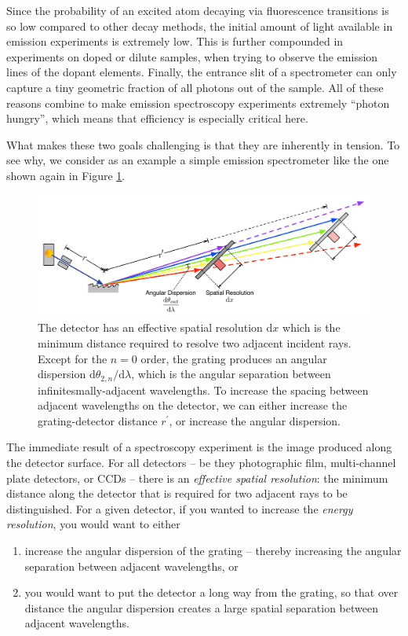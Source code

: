 Since the probability of an excited atom decaying via fluorescence transitions is so low compared to other decay methods, the initial amount of light available in emission experiments is extremely low.  This is further compounded in experiments on doped or dilute samples, when trying to observe the emission lines of the dopant elements.  Finally, the entrance slit of a spectrometer can only capture a tiny geometric fraction of all photons out of the sample.  All of these reasons combine to make emission spectroscopy experiments extremely ``photon hungry'', which means that efficiency is especially critical here.

What makes these two goals challenging is that they are inherently in tension.  To see why, we consider as an example a simple emission spectrometer like the one shown again in Figure \ref{1f}.

\begin{figure}[htbp] %
   \centering
   \includegraphics[scale=0.6]{../data/Chapter1/1f_spectrometerResolution/1f_2.pdf} 
   \caption{The detector has an effective spatial resolution $\mathrm{d}x$ which is the minimum distance required to resolve two adjacent incident rays.  Except for the $n=0$ order, the grating produces an angular dispersion $\mathrm{d}\theta_{2,n}/\mathrm{d}\lambda$, which is the angular separation between infinitesmally-adjacent wavelengths.  To increase the spacing between adjacent wavelengths on the detector, we can either increase the grating-detector distance $r^\prime$, or increase the angular dispersion. }
   \label{1f}
\end{figure}
               
The immediate result of a spectroscopy experiment is the image produced along the detector surface.  For all detectors -- be they photographic film, multi-channel plate detectors, or CCDs -- there is an \emph{effective spatial resolution}: the minimum distance along the detector that is required for two adjacent rays to be distinguished.  For a given detector, if you wanted to increase the \emph{energy resolution}, you would want to either 
\begin{enumerate}
\item increase the angular dispersion of the grating -- thereby increasing the angular separation between adjacent wavelengths, or 
\item you would want to put the detector a long way from the grating, so that over distance the angular dispersion creates a large spatial separation between adjacent wavelengths.
\end{enumerate}

